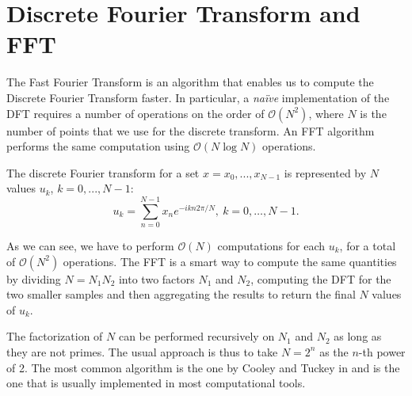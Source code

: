 \chapter{Discrete Fourier Transform and FFT}
\label{app:FFT}

The Fast Fourier Transform is an algorithm that enables us to compute the Discrete Fourier Transform faster. In particular, a \textit{na\"ive} implementation of the DFT requires a number of operations on the order of $\mathcal{O}(N^2)$, where $N$ is the number of points that we use for the discrete transform. An FFT algorithm performs the same computation using $\mathcal{O}(N \log N)$ operations.


 The discrete Fourier transform for a set $x = x_0 , ..., x_{N-1}$ is  represented by $N$ values $u_k$, $k=0, ..., N-1$:
\begin{equation}
\label{eq:dft_single}
	u_k = \sum_{n=0}^{N-1} x_n e^{-i  k n 2\pi / N}, \: k= 0, \dots, N-1.
\end{equation}


As we can see, we have to perform $\mathcal{O}(N)$ computations for each $u_k$, for a total of $\mathcal{O}(N^2)$ operations.
The FFT is a smart way to compute the same quantities by dividing $ N = N_1N_2$ into two factors $ N_1$ and $N_2$, computing the DFT for the two smaller samples and then aggregating the results to return the final $N$ values of $u_k$.

The factorization of $N$ can be performed recursively on $N_1$ and $N_2$ as long as they are not primes. The usual approach is thus to take $N=2^n$ as the $n$-th power of 2. 
The most common algorithm is the one by Cooley and Tuckey in \cite{COOLEY_FFT} and is the one that is usually implemented in most computational tools.




